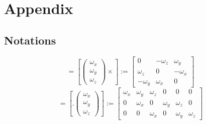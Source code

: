 

\chapter*{Appendix}
\label{appendix}
\vspace{1cm}

\section{Notations}
\begin{equation}
	[\omega \times] = [\begin{pmatrix} \omega_x \\ \omega_y \\ \omega_z \end{pmatrix} \times] := 
	\begin{bmatrix}
		0			& -\omega_z	& \omega_y \\
		\omega_z	& 0			& -\omega_x \\
		-\omega_y	& \omega_x	& 0
	\end{bmatrix}
\end{equation}
\begin{equation}
	[. \omega] = [. \begin{pmatrix} \omega_x \\ \omega_y \\ \omega_z \end{pmatrix}] :=
	\begin{bmatrix}
		\omega_x	& \omega_y	& \omega_z	& 0			& 0			& 0 \\
		0			& \omega_x	& 0			& \omega_y	& \omega_z	& 0 \\
		0			& 0			& \omega_x	& 0			& \omega_y	& \omega_z
	\end{bmatrix}
\end{equation}
